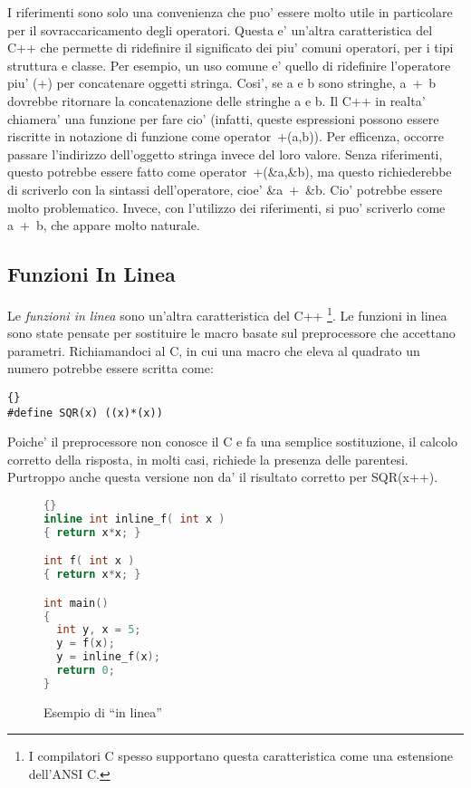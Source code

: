 I riferimenti sono solo una convenienza che puo' essere molto
utile in particolare per il sovraccaricamento degli operatori. Questa
e' un'altra caratteristica del C++ che permette di ridefinire il
significato dei piu' comuni operatori, per i tipi struttura e 
classe. Per esempio, un uso comune e' quello di ridefinire l'operatore 
piu' ({\code +}) per concatenare oggetti stringa. Cosi', se {\code a}
e {\code b} sono stringhe, {\code a~+~b} dovrebbe ritornare la
concatenazione delle stringhe {\code a} e {\code b}. Il C++ in realta'
chiamera' una funzione per fare cio' (infatti, queste espressioni  
possono essere riscritte in notazione di funzione come {\code operator~+(a,b)}).
Per efficenza, occorre passare l'indirizzo dell'oggetto stringa invece
del loro valore. Senza riferimenti, questo potrebbe essere fatto come
{\code operator~+(\&a,\&b)}, ma questo richiederebbe di scriverlo
con la sintassi dell'operatore, cioe' {\code \&a~+~\&b}. Cio' potrebbe
essere molto problematico. Invece, con l'utilizzo dei riferimenti,
si puo' scriverlo come {\code a~+~b}, che appare molto naturale.   

\subsection{Funzioni In Linea}

Le \emph{funzioni in linea} sono un'altra caratteristica del C++
\footnote{I compilatori C spesso supportano questa caratteristica
come una estensione dell'ANSI C.}. Le funzioni in linea sono state
pensate per sostituire le macro basate sul preprocessore che 
accettano parametri. Richiamandoci al C, in cui una macro che eleva
al quadrato un numero potrebbe essere scritta come: 
\begin{lstlisting}[stepnumber=0]{}
#define SQR(x) ((x)*(x))
\end{lstlisting}
\noindent Poiche' il preprocessore non conosce il C e fa una semplice
sostituzione, il calcolo corretto della risposta, in molti casi, richiede
la presenza delle parentesi. Purtroppo anche questa versione non da' il
risultato corretto per {\code SQR(x++)}.

\begin{figure}
\begin{lstlisting}[language=C++,frame=tlrb]{}
inline int inline_f( int x ) 
{ return x*x; }

int f( int x ) 
{ return x*x; }

int main()
{
  int y, x = 5;
  y = f(x);
  y = inline_f(x);
  return 0;
}
\end{lstlisting}
\caption{Esempio di ``in linea'' \label{fig:InlineFun}}
\end{figure}

